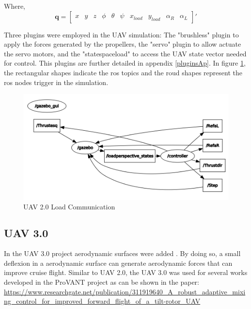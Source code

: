 Where, 
\begin{equation*}
\bm{q} = \begin{bmatrix}
x & y & z & \phi & \theta & \psi & x_{load} & y_{load} & \alpha_R & \alpha_L
\end{bmatrix}' 
\end{equation*} 

Three plugins were employed in the UAV simulation: The "brushless" plugin to apply the forces generated by the propellers, the "servo" plugin to allow actuate the servo motors, and the "statespaceload" to access the UAV state vector needed for control. This plugins are further detailed in appendix \ref{pluginsAp}. In figure \ref{v2loadgraph}, the rectangular shapes indicate the ros topics and the roud shapes represent the ros nodes trigger in the simulation.

\begin{figure}[!ht]
	\centering
	\includegraphics[width=350pt]{figuras/v2loadgraph.png}
	\caption{UAV 2.0 Load Communication}
	\label{v2loadgraph}
\end{figure}


\subsection{UAV 3.0}

In the UAV 3.0 project aerodynamic surfaces were added . By doing so, a small deflexion in a aerodynamic surface can generate aerodynamic forces that can improve cruise flight. Similar to UAV 2.0, the UAV 3.0 was used for several works developed in the ProVANT project as can be shown in the paper: \url{https://www.researchgate.net/publication/311919640_A_robust_adaptive_mixing_control_for_improved_forward_flight_of_a_tilt-rotor_UAV}



